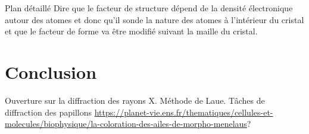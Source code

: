 \begin{reportBlock}{Plan détaillé}
  Dire que le facteur de structure dépend de la densité électronique autour des atomes et donc qu'il sonde la nature des atomes à l'intérieur du cristal et que le facteur de forme va être modifié suivant la maille du cristal.
\section*{Conclusion}
Ouverture sur la diffraction des rayons X. Méthode de Laue. Tâches de diffraction des papillons \url{https://planet-vie.ens.fr/thematiques/cellules-et-molecules/biophysique/la-coloration-des-ailes-de-morpho-menelaus}?
\end{reportBlock}



